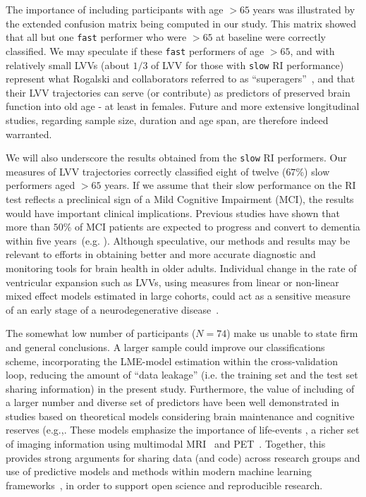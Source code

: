 \documentclass[10pt,letterpaper]{article}
\begin{document}
The importance of including participants with age $>65$ years was illustrated by the extended confusion matrix being computed in our study. This matrix showed that all but one {\tt fast} performer who were $>65$ at baseline were correctly classified. We may speculate if these {\tt fast} performers of age $>65$, and with relatively small LVVs (about $1/3$ of LVV for those with {\tt slow} RI performance) represent what Rogalski and collaborators referred to as ``superagers”~\cite{Rogalski2013}, and that their LVV trajectories can serve (or contribute) as predictors of preserved brain function into old age - at least in females. Future and more extensive longitudinal studies, regarding sample size, duration and age span, are therefore indeed warranted.  

We will also underscore the results obtained from the {\tt slow} RI performers. Our measures of LVV trajectories correctly classified eight of twelve ($67$\%) slow performers aged $>65$ years.  
If we assume that their slow performance on the RI test reflects a preclinical sign of a Mild Cognitive Impairment (MCI), the results would have important clinical implications. Previous studies have shown that more than $50$\% of MCI patients are expected to progress and convert to dementia within five years~(e.g. \cite{Gauthier2006}). Although speculative, our methods and results may be relevant to efforts in obtaining better and more accurate diagnostic and monitoring tools for brain health in older adults. Individual change in the rate of ventricular expansion such as LVVs, using measures from linear or non-linear mixed effect models estimated in large cohorts, could act as a sensitive measure of an early stage of a neurodegenerative disease~\cite{Jack2004}.

The somewhat low number of participants ($N=74$) make us unable to state firm and general conclusions. A larger sample 
could improve our classifications scheme, incorporating the LME-model estimation within the cross-validation loop, reducing the amount of ``data leakage” (i.e. the training set and the test set sharing information) in the present study.
Furthermore, the value of including of a larger number and diverse set of predictors have been well demonstrated in studies based on theoretical models considering brain maintenance and cognitive reserves (e.g.,\cite{Nyberg2017, Reuter-Lorenz2014}. These models emphasize the importance of life-events \cite{Reuter-Lorenz2014, Stern2018}, a richer set of imaging information using multimodal MRI~\cite{Arbabshirani2017, Nyberg2019} and 
PET~\cite{Nyberg2016,Nevalainen2015}. Together, this provides strong arguments for sharing data (and code) across research groups \cite{Calhoun2016} and use of predictive models and methods within modern machine learning frameworks~\cite{Arbabshirani2017}, in order to support open science and reproducible research.\\
\end{document}

